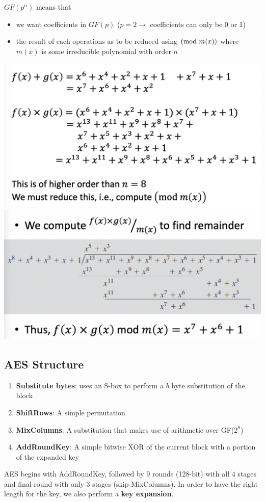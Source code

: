 $GF(p^n)$ means that 
\begin{itemize}
    \item we want coefficients in $GF(p)$ ($p=2\rightarrow$ coefficients can only be 0 or 1)
    \item the result of each operations as to be reduced using $(\mathrm{mod}\ m(x))$ where $m(x)$ is some irreducible polynomial with order $n$
\end{itemize}
\begin{center}
    \includegraphics[scale=0.2]{images/gf1.png}
    \includegraphics[scale=0.2]{images/gf2.png}
\end{center}

\subsection{AES Structure}
\begin{enumerate}
    \item \textbf{Substitute bytes}: uses an S-box to perform a $b$ byte substitution of the block
    \item \textbf{ShiftRows}: A simple permutation
    \item \textbf{MixColumns}: A substitution that makes use of arithmetic over GF($2^8$)
    \item \textbf{AddRoundKey}: A simple bitwise XOR of the current block with a portion of the expanded key
\end{enumerate}
AES begins with AddRoundKey, followed by $9$ rounds (128-bit) with all $4$ stages and final round with only $3$ stages (skip MixColumns). In order to have the right length for the key, we also perform a \textbf{key expansion}.